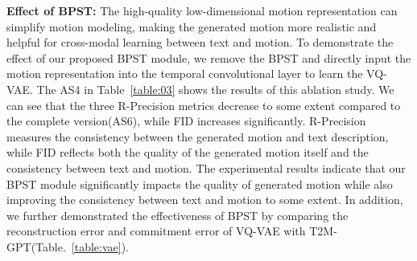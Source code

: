 \documentclass[10pt,twocolumn,letterpaper]{article}
\begin{document}
\textbf{Effect of BPST:}
The high-quality low-dimensional motion representation can simplify motion modeling, making the generated motion more realistic and helpful for cross-modal learning between text and motion. To demonstrate the effect of our proposed BPST module, we remove the BPST and directly input the motion representation into the temporal convolutional layer to learn the VQ-VAE. The AS4 in Table~\ref{table:03} shows the results of this ablation study. We can see that the three R-Precision metrics decrease to some extent compared to the complete version(AS6), while FID increases significantly. R-Precision measures the consistency between the generated motion and text description, while FID reflects both the quality of the generated motion itself and the consistency between text and motion. The experimental results indicate that our BPST module significantly impacts the quality of generated motion while also improving the consistency between text and motion to some extent. In addition, we further demonstrated the effectiveness of BPST by comparing the reconstruction error and commitment error of VQ-VAE with T2M-GPT(Table.~\ref{table:vae}).
\end{document}
